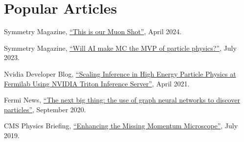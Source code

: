 \section{Popular Articles}
\begin{description}[leftmargin=12pt,font=\normalfont,labelsep=0em]
\item Symmetry Magazine, \href{https://www.symmetrymagazine.org/article/this-is-our-muon-shot}{``This is our Muon Shot''}, April 2024.
\item Symmetry Magazine, \href{https://www.symmetrymagazine.org/article/will-ai-make-mc-the-mvp-of-particle-physics}{``Will AI make MC the MVP of particle physics?''}, July 2023.
\item Nvidia Developer Blog, \href{https://developer.nvidia.com/blog/scaling-inference-in-high-energy-particle-physics-at-fermilab-using-nvidia-triton-inference-server/}{``Scaling Inference in High Energy Particle Physics at Fermilab Using NVIDIA Triton Inference Server''}, April 2021.
\item Fermi News, \href{https://news.fnal.gov/2020/09/the-next-big-thing-the-use-of-graph-neural-networks-to-discover-particles/}{``The next big thing: the use of graph neural networks to discover particles''}, September 2020.
\item CMS Physics Briefing, \href{https://cms.cern/news/enhancing-missing-momentum-microscope}{``Enhancing the Missing Momentum Microscope''}, July 2019.
\end{description}

\ifdefined\longflag
{}
